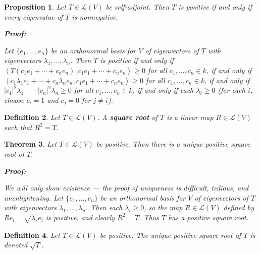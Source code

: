 \documentclass{article}
\theoremstyle{colontheorem}
\newtheorem{theorem}{Theorem}[section]
\newtheorem{proposition}[theorem]{Proposition}
\newtheorem{definition}[theorem]{Definition}
\newenvironment{Theorem}
{
	\begin{mdframed}[backgroundcolor=TheoremOrange!10]
	\begin{theorem}
}
{
	\end{theorem}
	\end{mdframed}
	
	\vspace{.15in}
}
\newenvironment{Proposition}
{
	\begin{mdframed}[backgroundcolor=TheoremOrange!10]
	\begin{proposition}
}
{
	\end{proposition}
	\end{mdframed}
	
	\vspace{.15in}
}
\newenvironment{Def}
{
	\begin{mdframed}[backgroundcolor=DefGreen!10]
	\begin{definition}
}
{
	\end{definition}
	\end{mdframed}
	
	\vspace{.15in}
}
\newenvironment{Proof}
{
	\begin{mdframed}[backgroundcolor=ProofPurple!10]
	\textbf{Proof:}%
}
{
	\end{mdframed}
	
	\vspace{.085in}
}
\begin{document}
\begin{Proposition}
	
	Let $T \in \mathcal{L}(V)$ be self-adjoint. Then $T$ is positive if and only if every eigenvalue of $T$ is nonnegative.
	
	\begin{Proof}
		Let $\{e_1, ..., e_n\}$ be an orthonormal basis for $V$ of eigenvectors of $T$ with eigenvectors $\lambda_1, ..., \lambda_n$. Then $T$ is positive if and only if $\left< T(c_1 e_1 + \cdots + c_n e_n), c_1 e_1 + \cdots + c_n e_n \right> \geq 0$ for all $c_1, ..., c_n \in k$, if and only if $\left< c_1 \lambda_1 e_1 + \cdots + c_n \lambda_n  e_n, c_1 e_1 + \cdots + c_n e_n \right> \geq 0$ for all $c_1, ..., c_n \in k$, if and only if $|c_1|^2 \lambda_1 + \cdots |c_n|^2 \lambda_n \geq 0$ for all $c_1, ..., c_n \in k$, if and only if each $\lambda_i \geq 0$ (for each $i$, choose $c_i = 1$ and $c_j = 0$ for $j \neq i$).
		
	\end{Proof}
	
\end{Proposition}



\begin{Def}
	
	Let $T \in \mathcal{L}(V)$. A \textbf{square root} of $T$ is a linear map $R \in \mathcal{L}(V)$ such that $R^2 = T$.
	
\end{Def}



\begin{Theorem}
	
	Let $T \in \mathcal{L}(V)$ be positive. Then there is a unique positive square root of $T$.
	
	\begin{Proof}
		We will only show existence --- the proof of uniqueness is difficult, tedious, and unenlightening. Let $\{e_1, ..., e_n\}$ be an orthonormal basis for $V$ of eigenvectors of $T$ with eigenvectors $\lambda_1, ..., \lambda_n$. Then each $\lambda_i \geq 0$, so the map $R \in \mathcal{L}(V)$ defined by $Re_i = \sqrt{\lambda_i} e_i$ is positive, and clearly $R^2 = T$. Thus $T$ has a positive square root.
				
	\end{Proof}
	
\end{Theorem}



\begin{Def}
	
	Let $T \in \mathcal{L}(V)$ be positive. The unique positive square root of $T$ is denoted $\sqrt{T}$.
	
\end{Def}
\end{document}
